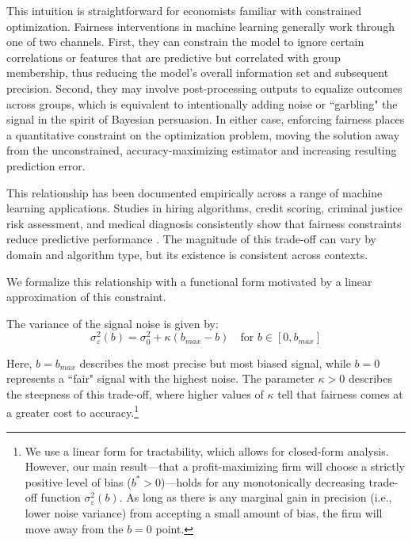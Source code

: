 This intuition is straightforward for economists familiar with constrained optimization. Fairness interventions in machine learning generally work through one of two channels. First, they can constrain the model to ignore certain correlations or features that are predictive but correlated with group membership, thus reducing the model's overall information set and subsequent precision. Second, they may involve post-processing outputs to equalize outcomes across groups, which is equivalent to intentionally adding noise or ``garbling" the signal in the spirit of Bayesian persuasion. In either case, enforcing fairness places a quantitative constraint on the optimization problem, moving the solution away from the unconstrained, accuracy-maximizing estimator and increasing resulting prediction error.

This relationship has been documented empirically across a range of machine learning applications. Studies in hiring algorithms, credit scoring, criminal justice risk assessment, and medical diagnosis consistently show that fairness constraints reduce predictive performance \citep{Kleinberg2017, Chouldechova2017}. The magnitude of this trade-off can vary by domain and algorithm type, but its existence is consistent across contexts.

We formalize this relationship with a functional form motivated by a linear approximation of this constraint.

\begin{definition}
The variance of the signal noise is given by:
\begin{equation}
\sigma_\varepsilon^2(b) = \sigma_0^2 + \kappa(b_{max} - b) \quad \text{for } b \in [0, b_{max}]
\end{equation}
\end{definition}

Here, $b=b_{max}$ describes the most precise but most biased signal, while $b=0$ represents a ``fair" signal with the highest noise. The parameter $\kappa > 0$ describes the steepness of this trade-off, where higher values of $\kappa$ tell that fairness comes at a greater cost to accuracy.\footnote{We use a linear form for tractability, which allows for closed-form analysis. However, our main result—that a profit-maximizing firm will choose a strictly positive level of bias ($b^*>0$)—holds for any monotonically decreasing trade-off function $\sigma_\varepsilon^2(b)$. As long as there is any marginal gain in precision (i.e., lower noise variance) from accepting a small amount of bias, the firm will move away from the $b=0$ point.}

